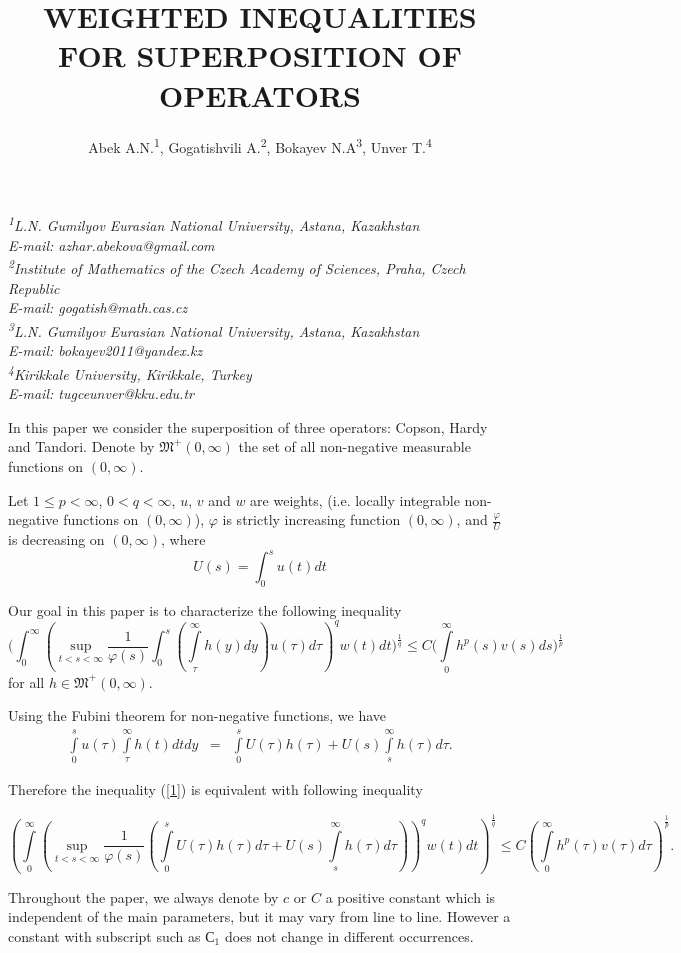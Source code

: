 \documentclass[12pt]{article}
\title{WEIGHTED INEQUALITIES FOR SUPERPOSITION OF OPERATORS}
\author{Abek A.N.\textsuperscript{1}, Gogatishvili A.\textsuperscript{2}, Bokayev N.A\textsuperscript{3}, Unver T.\textsuperscript{4}}
\date{}
\makeatletter
\renewcommand{\maketitle}{%
    \begin{center}
        \Large\@title

        \vspace{0.4cm}
        \large\@author

        \vspace{0.5cm}
        \normalsize\textit{\textsuperscript{1}L.N. Gumilyov Eurasian National University, Astana, Kazakhstan\\
          E-mail: azhar.abekova@gmail.com\\
          \textsuperscript{2}Institute of Mathematics of the
 Czech Academy of Sciences, Praha, Czech Republic\\
          E-mail: gogatish@math.cas.cz\\
          \textsuperscript{3}L.N. Gumilyov Eurasian National University, Astana, Kazakhstan\\
          E-mail: bokayev2011@yandex.kz\\
          \textsuperscript{4}Kirikkale University, Kirikkale, Turkey\\
          E-mail: tugceunver@kku.edu.tr\\}
          
    \end{center}}
\makeatother
\begin{document}
\maketitle

In this paper we consider the superposition of three operators: Copson, Hardy and Tandori. Denote by $\mathfrak{M}^+(0,\infty)$ the set of all non-negative measurable functions on $(0,\infty)$.

Let $1\leq p<\infty$, $0<q<\infty$, $u$, $v$ and $w$ are weights, (i.e. locally integrable non-negative functions on $(0,\infty)$),  $\varphi$ is strictly increasing function $(0,\infty)$, and $\frac{\varphi}{U}$ is decreasing on $(0,\infty)$,  where
\[U(s)=\int_{0}^{s}u(t)dt\]

Our goal in this paper is to characterize  the following inequality
\begin{equation}\Bigg(\int_{0}^{\infty}\left({\sup_{t<s<\infty}}\frac{1}{\varphi(s)}\int_{0}^{s} \left(\int\limits_{\tau}^{\infty}h(y)dy\right)u(\tau)d\tau\right)^q w(t) dt\Bigg)^{\frac{1}{q}}\leq C\Big(\int\limits_{0}^{\infty}h^p(s)v(s)ds\Big)^{\frac{1}{p}} \label{1}
\end{equation}
for all $h\in \mathfrak{M}^+(0,\infty)$.

Using the Fubini theorem  for non-negative functions, we have
\begin{eqnarray*}
\int\limits_{0}^{s}u(\tau)\int\limits_{\tau}^{\infty}h(t)dt dy&=& \int\limits_{0}^{s}U(\tau)h(\tau)+U(s)\int\limits_{s}^{\infty}h(\tau)d\tau. \label{2}
\end{eqnarray*}

Therefore the inequality (\ref{1}) is equivalent with following inequality

\begin{equation}\left(\int\limits_{0}^{\infty}\left({\sup_{t<s<\infty}}\frac{1}{\varphi(s)}\left(\int\limits_{0}^{s} U(\tau) h(\tau)d\tau+U(s)\int\limits_{s}^{\infty}h(\tau)d\tau \right)\right)^qw(t)dt\right)^{\frac{1}{q}}\leq C\left(\int\limits_{0}^{\infty}h^p(\tau)v(\tau)d\tau\right)^{\frac{1}{p}}.
\label{3}  
\end{equation}

Throughout the paper, we always denote by $c$ or $C$ a positive constant which is
independent of the main parameters, but it may vary from line to line. However a constant
with subscript such as $С_1$ does not change in different occurrences.
\end{document}
